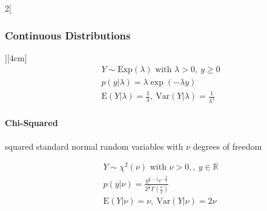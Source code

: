 \documentclass[8pt]{extarticle}
\begin{document}
\begin{multicols}{2}[\subsubsection{Continuous Distributions}][4cm]
    \begin{align*}
    & Y \sim \mathrm{Exp}(\lambda) \text{ with } \lambda > 0,\: y \geq 0\\
    & p(y|\lambda) = \lambda\exp (-\lambda y) \\
    & \mathrm{E}(Y|\lambda) = \frac{1}{\lambda}, \:
	\mathrm{Var}(Y|\lambda) = \frac{1}{\lambda^2}
  \end{align*}
  
  
  	\paragraph{Chi-Squared} squared standard normal random variables with $\nu$ degrees of freedom
  
    \begin{align*}
    & Y \sim \chi^2(\nu) \text{ with } \nu > 0,,\: y \in \mathbb{R}\\
    & p(y|\nu) = \frac{y^{\frac{\nu}{2}-1}e^{-\frac{y}{2}}}{2^{\frac{\nu}{2}}\Gamma \left(\frac{\nu}{2}\right)} \\
    & \mathrm{E}(Y|\nu) = \nu, \:
	\mathrm{Var}(Y|\nu) = 2\nu
  \end{align*}

\end{multicols}
\end{document}
